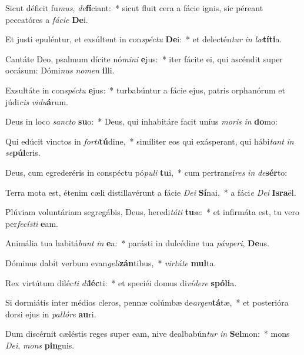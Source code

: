 \item Sicut déficit fu\textit{mus}, \textit{de}\textbf{fí}ciant:~* sicut fluit cera a fácie ignis, sic péreant peccatóres a \textit{fá}\textit{ci}\textit{e} \textbf{De}i.
\item Et justi epuléntur, et exsúltent in con\textit{spéc}\textit{tu} \textbf{De}i:~* et delectén\textit{tur} \textit{in} \textit{læ}\textbf{tí}\textbf{ti}a.
\item Cantáte Deo, psalmum dícite nó\textit{mi}\textit{ni} \textbf{e}jus:~* iter fácite ei, qui ascéndit super occásum: Dómi\textit{nus} \textit{no}\textit{men} \textbf{il}li.
\item Exsultáte in con\textit{spéc}\textit{tu} \textbf{e}jus:~* turbabúntur a fácie ejus, patris orphanórum et júdi\textit{cis} \textit{vi}\textit{du}\textbf{á}rum.
\item Deus in loco \textit{sanc}\textit{to} \textbf{su}o:~* Deus, qui inhabitáre facit uníus \textit{mo}\textit{ris} \textit{in} \textbf{do}mo:
\item Qui edúcit vinctos in \textit{for}\textit{ti}\textbf{tú}dine,~* simíliter eos qui exásperant, qui hábi\textit{tant} \textit{in} \textit{se}\textbf{púl}cris.
\item Deus, cum egrederéris in conspéctu pó\textit{pu}\textit{li} \textbf{tu}i,~* cum pertransí\textit{res} \textit{in} \textit{de}\textbf{sér}to:
\item Terra mota est, étenim cæli distillavérunt a fácie \textit{De}\textit{i} \textbf{Sí}nai,~* a fáci\textit{e} \textit{De}\textit{i} \textbf{Is}\textbf{ra}ël.
\item Plúviam voluntáriam segregábis, Deus, heredi\textit{tá}\textit{ti} \textbf{tu}æ:~* et infirmáta est, tu vero per\textit{fe}\textit{cís}\textit{ti} \textbf{e}am.
\item Animália tua habitá\textit{bunt} \textit{in} \textbf{e}a:~* parásti in dulcédine tua \textit{páu}\textit{pe}\textit{ri}, \textbf{De}us.
\item Dóminus dabit verbum evan\textit{ge}\textit{li}\textbf{zán}tibus,~* \textit{vir}\textit{tú}\textit{te} \textbf{mul}ta.
\item Rex virtútum diléc\textit{ti} \textit{di}\textbf{léc}ti:~* et speciéi domus di\textit{ví}\textit{de}\textit{re} \textbf{spó}\textbf{li}a.
\item Si dormiátis inter médios cleros, pennæ colúmbæ de\textit{ar}\textit{gen}\textbf{tá}tæ,~* et posterióra dorsi ejus in \textit{pal}\textit{ló}\textit{re} \textbf{au}ri.
\item Dum discérnit cæléstis reges super eam, nive dealbabún\textit{tur} \textit{in} \textbf{Sel}mon:~* mons \textit{De}\textit{i}, \textit{mons} \textbf{pin}guis.

